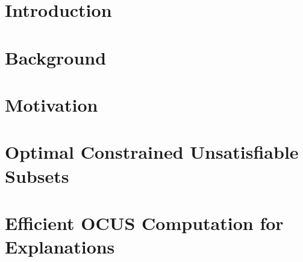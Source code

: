 \documentclass{article}
\newcommand\m[1]{\ensuremath{\mathcal{#1}}}
\newcommand\ignore[1]{}
\newcommand\comment[1]{\marginpar{\parbox{\marginparwidth}{\tiny #1}}}
\renewcommand\comment[1]{#1}
\newcommand{\todo}[1]{{\comment{\color{red}\textsc{TODO:}#1} }}
\newcommand\F{\ensuremath{\m{F} }\xspace}
\newcommand\formula{\ensuremath{\m{F} }\xspace}
\newcommand\mm[1]{\ensuremath{#1}\xspace}
\newcommand\call[1]{\mm{\textsc{#1}}}
\newcommand\sat{\mm{\call{{SAT}}}}
\newcommand\grow{\mm{\call{Grow}}}
\newcommand\comus{\mm{\call{OCUS}}}
\begin{document}
\section{Introduction}


\section{Background}\label{sec:backgr}\label{sec:background}


\section{Motivation}\label{sec:motivation}\label{sec:motviation}


\section{Optimal Constrained Unsatisfiable Subsets} \label{sec:ocus}



\section{Efficient OCUS Computation for Explanations}\label{sec:ocusEx}




\ignore{
    \section{Implementation considerations}\label{sec:impl}
    \todo{REMOVE}
    REMOVE
    When we check the satisfiability of a set $\F'$ we initialise the polarity of the literals to $I_{end}$. We use assumptions to keep the solver warm across different sets $\F'$.

    The implementation of \grow can be achieved in different ways.
    In our algorithms we use the model found by the $\sat(\F')$ call and let a MaxSAT solver complete it to a full assignment over $\F$. Our custom implementations of a greedy grow were consistently outperformed by the MaxSAT call. We believe this is because typically only a fraction of literals of $\F$ are left unassigned in the model of $\F'$ and a MaxSAT solver has highly optimized data-structures to manage $\F$.  %

    In $\comus$, we keep the MIP solver warm and reuse it across all $\comus$ calls. We only ever add constraints to the solver. To handle the changes in $p$ with respect to literals that cannot be chosen, we enforce this by temporarily setting the objective weight to $+\infty$ for literals.
}
\end{document}
